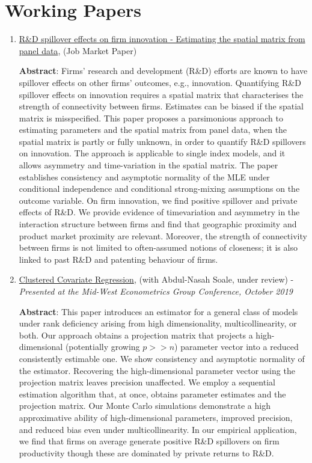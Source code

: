 \documentclass[12pt,letterpaper]{article}
\begin{document}
\section*{Working Papers} %
\begin{enumerate}
	\item  \href{https://estsyawo.github.io/Tsyawo_JMP.pdf#}{R\&D spillover effects on firm innovation - Estimating the spatial matrix from panel data}, (Job Market Paper)
	
	\textbf{Abstract}: Firms’ research and development (R\&D) efforts are known to have spillover effects on other
firms’ outcomes, e.g., innovation. Quantifying R\&D spillover effects on innovation requires a
	spatial matrix that characterises the strength of connectivity between firms. Estimates can be
	biased if the spatial matrix is misspecified. This paper proposes a parsimonious approach to
	estimating parameters and the spatial matrix from panel data, when the spatial matrix is partly
	or fully unknown, in order to quantify R\&D spillovers on innovation. The approach is applicable
	to single index models, and it allows asymmetry and time-variation in the spatial matrix.
	The paper establishes consistency and asymptotic normality of the MLE under conditional
	independence and conditional strong-mixing assumptions on the outcome variable. On firm
	innovation, we find positive spillover and private effects of R\&D. We provide evidence of timevariation and asymmetry in the interaction structure between firms and find that geographic
	proximity and product market proximity are relevant. Moreover, the strength of connectivity
	between firms is not limited to often-assumed notions of closeness; it is also linked to past R\&D
and patenting behaviour of firms.
	
	\item \href{https://papers.ssrn.com/sol3/papers.cfm?abstract_id=3394012}{Clustered Covariate Regression}, (with Abdul-Nasah Soale, under review) - \textit{Presented at the Mid-West Econometrics Group Conference, October 2019}
	
	\textbf{Abstract}: This paper introduces an estimator for a general class of models under rank deficiency arising from high dimensionality, multicollinearity, or both. Our approach obtains a projection matrix that projects a high-dimensional (potentially growing $ p >> n $) parameter vector into a reduced consistently estimable one. We show consistency and asymptotic normality of the estimator. Recovering the high-dimensional parameter vector using the projection matrix leaves precision unaffected. We employ a sequential estimation algorithm that, at once, obtains parameter estimates and the projection matrix. Our Monte Carlo simulations demonstrate a high approximative ability of high-dimensional parameters, improved precision, and reduced bias even under multicollinearity. In our empirical application, we find that firms on average generate positive R\&D spillovers on firm productivity though these are dominated by private returns to R\&D.
	

\end{enumerate}
\end{document}
